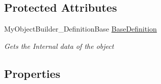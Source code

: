 \subsection*{Protected Attributes}
\begin{DoxyCompactItemize}
\item 
My\+Object\+Builder\+\_\+\+Definition\+Base \hyperlink{class_s_e_mod_a_p_i_1_1_a_p_i_1_1_definitions_1_1_definition_over_layer_a9ef44b7d179c2f5486a5f2a8f7e7b26f}{Base\+Definition}
\begin{DoxyCompactList}\small\item\em Gets the Internal data of the object \end{DoxyCompactList}\end{DoxyCompactItemize}
\subsection*{Properties}
